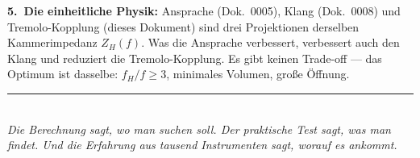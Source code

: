 \documentclass[11pt,a4paper]{article}
\begin{document}
\begin{keybox}
\textbf{5.\ Die einheitliche Physik:} Ansprache (Dok.~0005), Klang (Dok.~0008) und Tremolo-Kopplung (dieses Dokument) sind drei Projektionen derselben Kammerimpedanz $Z_H(f)$. Was die Ansprache verbessert, verbessert auch den Klang und reduziert die Tremolo-Kopplung. Es gibt keinen Trade-off --- das Optimum ist dasselbe: $f_H/f \geq 3$, minimales Volumen, große Öffnung.
\end{keybox}

\vspace{3mm}
\begin{center}
\textcolor{accentred}{\rule{0.6\textwidth}{1pt}}\\[4pt]
{\small\itshape Die Berechnung sagt, wo man suchen soll. Der praktische Test sagt, was man findet. Und die Erfahrung aus tausend Instrumenten sagt, worauf es ankommt.}
\end{center}
\end{document}
